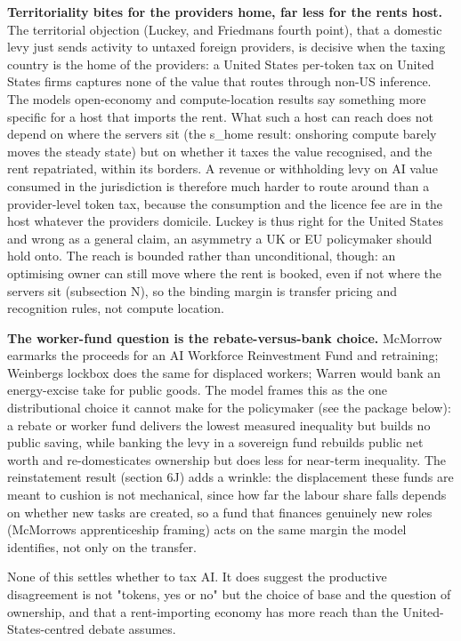 \documentclass[12pt]{article}
\begin{document}
\textbf{Territoriality bites for the provider\textquotesingle s home,
far less for the rent\textquotesingle s host.} The territorial objection
(Luckey, and Friedman\textquotesingle s fourth point), that a domestic
levy just sends activity to untaxed foreign providers, is decisive when
the taxing country is the home of the providers: a United States
per-token tax on United States firms captures none of the value that
routes through non-US inference. The model\textquotesingle s
open-economy and compute-location results say something more specific
for a host that imports the rent. What such a host can reach does not
depend on where the servers sit (the s\_home result: onshoring compute
barely moves the steady state) but on whether it taxes the value
recognised, and the rent repatriated, within its borders. A revenue or
withholding levy on AI value consumed in the jurisdiction is therefore
much harder to route around than a provider-level token tax, because the
consumption and the licence fee are in the host whatever the
provider\textquotesingle s domicile. Luckey is thus right for the United
States and wrong as a general claim, an asymmetry a UK or EU policymaker
should hold onto. The reach is bounded rather than unconditional,
though: an optimising owner can still move where the rent is booked,
even if not where the servers sit (subsection N), so the binding margin
is transfer pricing and recognition rules, not compute location.

\textbf{The worker-fund question is the rebate-versus-bank choice.}
McMorrow earmarks the proceeds for an AI Workforce Reinvestment Fund and
retraining; Weinberg\textquotesingle s lockbox does the same for
displaced workers; Warren would bank an energy-excise take for public
goods. The model frames this as the one distributional choice it cannot
make for the policymaker (see the package below): a rebate or worker
fund delivers the lowest measured inequality but builds no public
saving, while banking the levy in a sovereign fund rebuilds public net
worth and re-domesticates ownership but does less for near-term
inequality. The reinstatement result (section 6J) adds a wrinkle: the
displacement these funds are meant to cushion is not mechanical, since
how far the labour share falls depends on whether new tasks are created,
so a fund that finances genuinely new roles (McMorrow\textquotesingle s
apprenticeship framing) acts on the same margin the model identifies,
not only on the transfer.

None of this settles whether to tax AI. It does suggest the productive
disagreement is not "tokens, yes or no" but the choice of base and the
question of ownership, and that a rent-importing economy has more reach
than the United-States-centred debate assumes.
\end{document}
